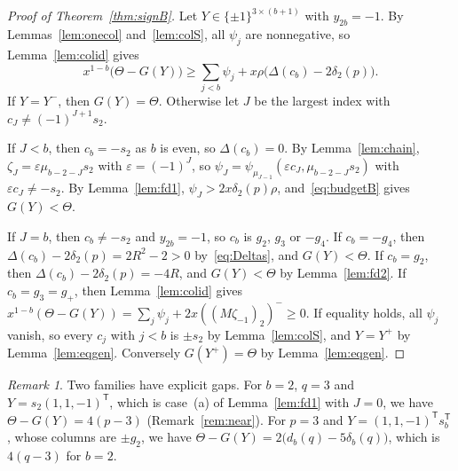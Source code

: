 \documentclass[11pt]{article}
\theoremstyle{remark}
\newtheorem{remark}[theorem]{Remark}
\begin{document}
\begin{proof}[Proof of Theorem~\ref{thm:signB}]
Let $Y\in\{\pm1\}^{3\times(b+1)}$ with $y_{2b}=-1$. By
Lemmas~\ref{lem:onecol} and~\ref{lem:colS}, all $\psi_j$ are nonnegative, so
Lemma~\ref{lem:colid} gives
\begin{equation}\label{eq:budgetB}
x^{1-b}\bigl(\Theta-G(Y)\bigr)\ge\sum_{j<b}\psi_j
+x\rho\bigl(\Delta(c_b)-2\delta_2(p)\bigr).
\end{equation}
If $Y=Y^-$, then $G(Y)=\Theta$. Otherwise let $J$ be the largest index with
$c_J\ne(-1)^{J+1}s_2$.

If $J<b$, then $c_b=-s_2$ as $b$ is even, so $\Delta(c_b)=0$. By
Lemma~\ref{lem:chain}, $\zeta_J=\varepsilon\mu_{b-2-J}s_2$ with
$\varepsilon=(-1)^J$, so
$\psi_J=\psi_{\mu_{J-1}}(\varepsilon c_J,\mu_{b-2-J}s_2)$ with
$\varepsilon c_J\ne-s_2$. By Lemma~\ref{lem:fd1},
$\psi_J>2x\delta_2(p)\rho$, and~\eqref{eq:budgetB} gives $G(Y)<\Theta$.

If $J=b$, then $c_b\ne-s_2$ and $y_{2b}=-1$, so $c_b$ is $g_2$, $g_3$ or
$-g_4$. If $c_b=-g_4$, then $\Delta(c_b)-2\delta_2(p)=2R^2-2>0$
by~\eqref{eq:Deltas}, and $G(Y)<\Theta$. If $c_b=g_2$, then
$\Delta(c_b)-2\delta_2(p)=-4R$, and $G(Y)<\Theta$ by Lemma~\ref{lem:fd2}. If
$c_b=g_3=g_+$, then Lemma~\ref{lem:colid} gives
$x^{1-b}(\Theta-G(Y))=\sum_j\psi_j+2x((M\zeta_{-1})_2)^-\ge0$. If equality
holds, all $\psi_j$ vanish, so every $c_j$ with $j<b$ is $\pm s_2$ by
Lemma~\ref{lem:colS}, and $Y=Y^+$ by Lemma~\ref{lem:eqgen}. Conversely
$G(Y^+)=\Theta$ by Lemma~\ref{lem:eqgen}.
\end{proof}

\begin{remark}\label{rem:tightB}
Two families have explicit gaps. For $b=2$, $q=3$ and
$Y=s_2(1,1,-1)^{\mathsf T}$, which is case~(a) of Lemma~\ref{lem:fd1} with
$J=0$, we have $\Theta-G(Y)=4(p-3)$ (Remark~\ref{rem:near}). For $p=3$ and
$Y=(1,1,-1)^{\mathsf T}s_b^{\mathsf T}$, whose columns are $\pm g_2$, we have
$\Theta-G(Y)=2\bigl(d_b(q)-5\delta_b(q)\bigr)$, which is $4(q-3)$ for $b=2$.
\end{remark}
\end{document}

